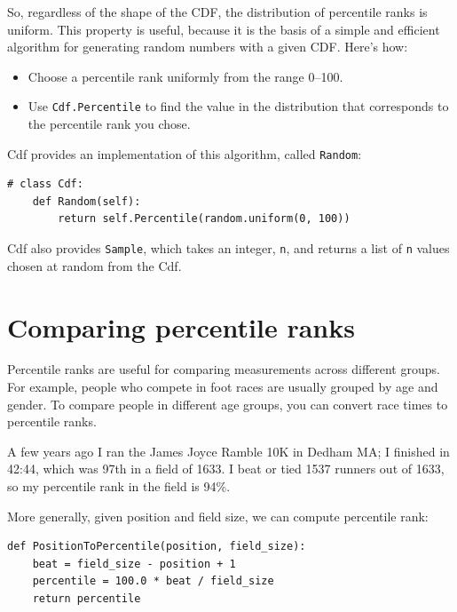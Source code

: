 \documentclass[12pt]{book}
\begin{document}
So, regardless of the shape of the CDF, the distribution of
percentile ranks is uniform.  This property is useful, because it
is the basis of a simple and efficient algorithm for generating
random numbers with a given CDF.  Here's how:

\begin{itemize}

\item Choose a percentile rank uniformly from the range 0--100.

\item Use \verb"Cdf.Percentile" to find the value in the distribution
that corresponds to the percentile rank you chose.

\end{itemize}

Cdf provides an implementation of this algorithm, called
\verb"Random":

\begin{verbatim}
# class Cdf:
    def Random(self):
        return self.Percentile(random.uniform(0, 100))
\end{verbatim}

Cdf also provides \verb"Sample", which takes an integer,
\verb"n", and returns a list of \verb"n" values chosen at random
from the Cdf.


\section{Comparing percentile ranks}

Percentile ranks are useful for comparing measurements across
different groups.  For example, people who compete in foot races are
usually grouped by age and gender.  To compare people in different
age groups, you can convert race times to percentile ranks.

A few years ago I ran the James Joyce Ramble 10K in
Dedham MA; I finished in 42:44, which was 97th in a field of 1633.  I beat or
tied 1537 runners out of 1633, so my percentile rank in the field is
94\%.   

More generally, given position and field size, we can compute
percentile rank:

\begin{verbatim}
def PositionToPercentile(position, field_size):
    beat = field_size - position + 1
    percentile = 100.0 * beat / field_size
    return percentile
\end{verbatim}
\end{document}
